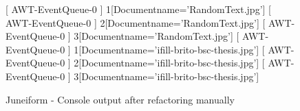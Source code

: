 \begin{figure}[h]
\begin{sourcecode}
\begin{textcode}{}
[ AWT-EventQueue-0 ] 1[Document{name='RandomText.jpg'}]
[ AWT-EventQueue-0 ] 2[Document{name='RandomText.jpg'}]
[ AWT-EventQueue-0 ] 3[Document{name='RandomText.jpg'}]
[ AWT-EventQueue-0 ] 1[Document{name='ifill-brito-bsc-thesis.jpg'}]
[ AWT-EventQueue-0 ] 2[Document{name='ifill-brito-bsc-thesis.jpg'}]
[ AWT-EventQueue-0 ] 3[Document{name='ifill-brito-bsc-thesis.jpg'}]
\end{textcode}
\caption{Juneiform - Console output after refactoring manually}
\label{code:example-console}
\end{sourcecode}
\end{figure}